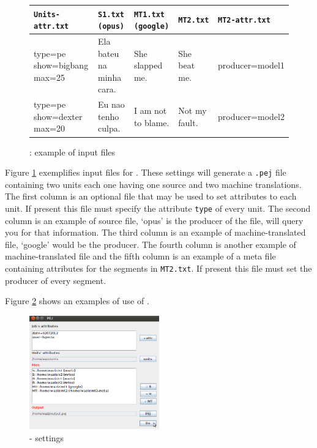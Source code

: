 \begin{figure}
\centering
\begin{tabular}{|p{3cm} | p{3cm} | p{3cm} | p{3cm} | p{3cm} | }
\hline
\bf \tt Units-attr.txt & \bf \tt S1.txt (opus) & \bf \tt MT1.txt (google) & \bf \tt MT2.txt & \bf \tt MT2-attr.txt\\ \hline \hline
type=pe show=bigbang max=25 & Ela bateu na minha cara. & She slapped me. & She beat me. & producer=model1 \\ \hline
type=pe show=dexter max=20 & Eu nao tenho culpa. & I am not to blame. & Not my fault. & producer=model2 \\ \hline 
\end{tabular}
\caption{\PEJ: example of input files}\label{fig:pejin}
\end{figure}

Figure \ref{fig:pejin} exemplifies input files for \PEJ. These settings will generate a {\tt .pej} file containing two units each one having one source and two machine translations.
The first column is an optional file that may be used to set attributes to each unit. If present this file must specify the attribute {\tt type} of every unit.
The second column is an example of source file, `opus' is the producer of the file, \PEJ will query you for that information.
The third column is an example of machine-translated file, `google' would be the producer.
The fourth column is another example of machine-translated file and the fifth column is an example of a meta file containing attributes for the segments in {\tt MT2.txt}. If present this file must set the producer of every segment.

Figure \ref{fig:pejset} shows an examples of use of \PEJ{}.


\begin{figure}[h]\label{fig:pejset}
\centering
\includegraphics[width=0.5\textwidth]{img/PEJ-settings}
\caption{\PEJ - settings}
\end{figure}

